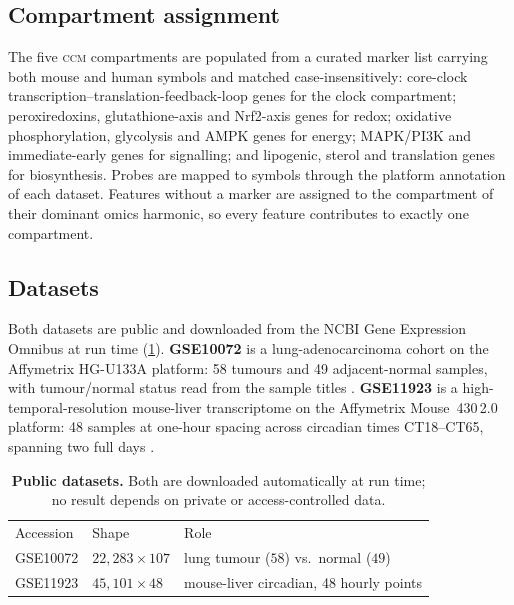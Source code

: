 \documentclass[preprint,12pt,amsmath,amssymb,superscriptaddress,floatfix]{revtex4-2}
\theoremstyle{definition}
\theoremstyle{plain}
\newcommand{\CCM}{\textsc{ccm}}
\begin{document}
\subsection{Compartment assignment}

The five \CCM{} compartments are populated from a curated marker list carrying
both mouse and human symbols and matched case-insensitively: core-clock
transcription--translation-feedback-loop genes for the clock compartment;
peroxiredoxins, glutathione-axis and Nrf2-axis genes for redox; oxidative
phosphorylation, glycolysis and AMPK genes for energy; MAPK/PI3K and
immediate-early genes for signalling; and lipogenic, sterol and translation genes
for biosynthesis. Probes are mapped to symbols through the platform annotation of
each dataset. Features without a marker are assigned to the compartment of their
dominant omics harmonic, so every feature contributes to exactly one compartment.

\subsection{Datasets}

Both datasets are public and downloaded from the NCBI Gene Expression Omnibus
\citep{edgar2002geo} at run time (\cref{tab:data}). \textbf{GSE10072} is a
lung-adenocarcinoma cohort on the Affymetrix HG-U133A platform: 58 tumours and 49
adjacent-normal samples, with tumour/normal status read from the sample titles
\citep{landi2008gene}. \textbf{GSE11923} is a high-temporal-resolution
mouse-liver transcriptome on the Affymetrix Mouse~430\,2.0 platform: 48 samples
at one-hour spacing across circadian times CT18--CT65, spanning two full days
\citep{hughes2009harmonics}.

\begin{table}[htbp]
\centering
\caption{\textbf{Public datasets.} Both are downloaded automatically at run time;
no result depends on private or access-controlled data.}
\label{tab:data}
\small
\begin{ruledtabular}
\begin{tabular}{lll}
Accession & Shape & Role \\
\colrule
GSE10072 & $22{,}283\times107$ & lung tumour ($58$) vs.\ normal ($49$) \\
GSE11923 & $45{,}101\times48$  & mouse-liver circadian, 48 hourly points \\
\end{tabular}
\end{ruledtabular}
\end{table}
\end{document}
